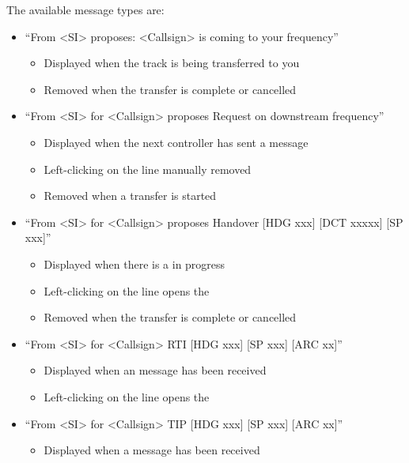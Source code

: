\documentclass[a4paper,oneside,11pt]{memoir}
\begin{document}
\bigskip

The available message types are:

\bigskip

\begin{itemize} 
    \item “From <SI> proposes: <Callsign> is coming to your frequency”
         \begin{itemize} 
            \item Displayed when the track is being transferred to you
            \item Removed when the transfer is complete or cancelled
         \end{itemize}
    \item “From <SI> for <Callsign> proposes Request on downstream frequency”
         \begin{itemize}
            \item Displayed when the next controller has sent a  message
            \item Left-clicking on the line manually removed
            \item Removed when a transfer is started
         \end{itemize} 
    \item “From <SI> for <Callsign> proposes Handover [HDG xxx] [DCT xxxxx] [SP xxx]”
        \begin{itemize}
            \item Displayed when there is a  in progress
            \item Left-clicking on the line opens the 
            \item Removed when the transfer is complete or cancelled
        \end{itemize} 
    \item “From <SI> for <Callsign> RTI [HDG xxx] [SP xxx] [ARC xx]”
        \begin{itemize}
            \item Displayed when an  message has been received
            \item Left-clicking on the line opens the 
        \end{itemize} 
    \item “From <SI> for <Callsign> TIP [HDG xxx] [SP xxx] [ARC xx]”
        \begin{itemize}
            \item Displayed when a  message has been received

\end{itemize}
\end{itemize}
\end{document}
